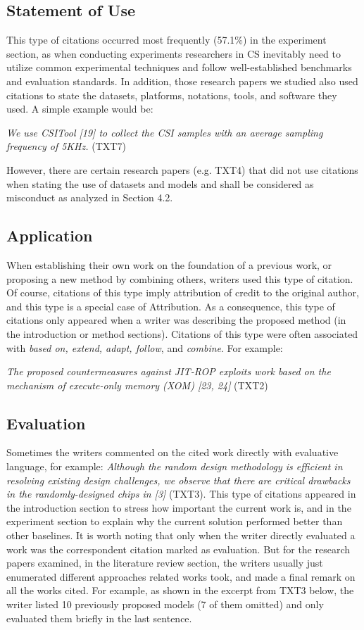 \subsection{Statement of Use}
This type of citations occurred most frequently (57.1\%) in the experiment section, as when conducting experiments researchers in CS inevitably need to utilize common experimental techniques and follow well-established benchmarks and evaluation standards. In addition, those research papers we studied also used citations to state the datasets, platforms, notations, tools, and software they used. A simple example would be:

\textit{We use CSITool [19] to collect the CSI samples with an average sampling frequency of 5KHz.} (TXT7)

However, there are certain research papers (e.g. TXT4) that did not use citations when stating the use of datasets and models and shall be considered as misconduct as analyzed in Section 4.2.

\subsection{Application}
When establishing their own work on the foundation of a previous work, or proposing a new method by combining others, writers used this type of citation. Of course, citations of this type imply attribution of credit to the original author, and this type is a special case of Attribution. As a consequence, this type of citations only appeared when a writer was describing the proposed method (in the introduction or method sections). Citations of this type were often associated with \textit{based on, extend, adapt, follow}, and \textit{combine}. For example:

\textit{The proposed countermeasures against JIT-ROP exploits work based on the mechanism of execute-only memory (XOM) [23, 24]} (TXT2)

\subsection{Evaluation}
Sometimes the writers commented on the cited work directly with evaluative language, for example: \textit{Although the random design methodology is efficient in resolving existing design challenges, we observe that there are critical drawbacks in the randomly-designed chips in [3]} (TXT3). This type of citations appeared in the introduction section to stress how important the current work is, and in the experiment section to explain why the current solution performed better than other baselines. It is worth noting that only when the writer directly evaluated a work was the correspondent citation marked as evaluation. But for the research papers examined, in the literature review section, the writers usually just enumerated different approaches related works took, and made a final remark on all the works cited. For example, as shown in the excerpt from TXT3 below, the writer listed 10 previously proposed models (7 of them omitted) and only evaluated them briefly in the last sentence.

